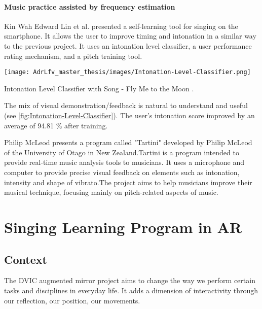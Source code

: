 \paragraph{Music practice assisted by frequency estimation}


Kin Wah Edward Lin et al. presented a self-learning tool for singing on the smartphone. It allows the user to improve timing and intonation in a similar way to the previous project. It uses an intonation level classifier, a user performance rating mechanism, and a pitch training tool. 

\begin{marginfigure}
    \centering
    \texttt{[image: AdrLfv\_master\_thesis/images/Intonation-Level-Classifier.png]}
    \caption{Intonation Level Classifier with Song - Fly Me to the Moon \cite{lin2014implementation}.}
    \label{fig:Intonation-Level-Classifier}
\end{marginfigure}

The mix of visual demonstration/feedback is natural to understand and useful (see \ref{fig:Intonation-Level-Classifier}). The user’s intonation score improved by an average of 94.81 \% after training.

Philip McLeod \cite{mcleodtartini} presents a program called "Tartini" developed by Philip McLeod of the University of Otago in New Zealand.Tartini is a program intended to provide real-time music analysis tools to musicians. It uses a microphone and computer to provide precise visual feedback on elements such as intonation, intensity and shape of vibrato.The project aims to help musicians improve their musical technique, focusing mainly on pitch-related aspects of music.

\section{Singing Learning Program in AR}

\subsection{Context}

The DVIC augmented mirror project aims to change the way we perform certain tasks and disciplines in everyday life.
It adds a dimension of interactivity through our reflection, our position, our movements.

